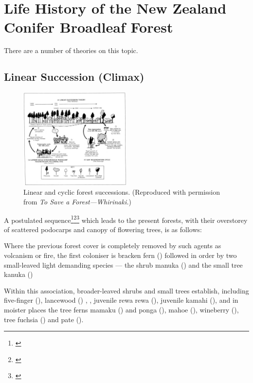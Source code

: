 \section{Life History of the New Zealand Conifer Broadleaf Forest}

There are a number of theories on this topic.

\subsection[Linear Succession (Climax)]{Linear Succession (Climax)}

\begin{figure}
	\includegraphics[width=0.5\textwidth]{graphics/figure64forestsuccession.jpg}
	\centering
	\caption[Linear and cyclic forest successions]{Linear and cyclic forest successions. (Reproduced with permission from \emph{To Save a Forest—Whirinaki.})}
	\label{fig:64forestsuccession}
\end{figure}

A postulated sequence\footnote{\cite{cockayne1928vegetation}}\footnote{\cite{mckelvey1963synecology}}\footnote{\cite{mckelvey1973pattern}} which leads to the present forests, with their overstorey of scattered podocarps and canopy of flowering trees, is as follows:

Where the previous forest cover is completely removed by such agents as volcanism or fire, the first coloniser is bracken fern () followed in order by two small-leaved light demanding species — the shrub manuka () and the small tree kanuka ()

Within this association, broader-leaved shrubs and small trees establish, including five-finger (), lancewood () , , juvenile rewa rewa (), juvenile kamahi (), and in moister places the tree ferns mamaku () and ponga (), mahoe (), wineberry (), tree fuchsia () and pate ().


